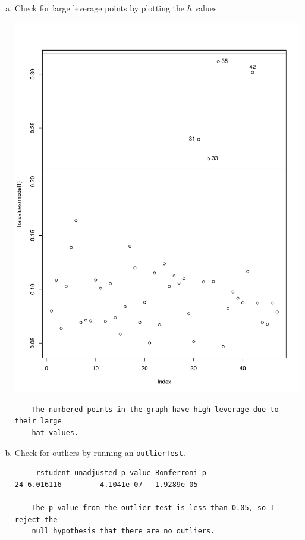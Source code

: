 \documentclass[12pt,letterpaper]{article}
\begin{document}
\begin{enumerate}[(a)]
	\item Check for large leverage points by plotting the $h$ values. 
	
	\includegraphics[width=.75\textwidth]{hatvalues.pdf}
	\begin{verbatim}
	The numbered points in the graph have high leverage due to their large
	hat values.
	\end{verbatim}
	
	\item Check for outliers by running an \texttt{outlierTest}. 
	
	\begin{verbatim}
	 rstudent unadjusted p-value Bonferroni p
24 6.016116         4.1041e-07   1.9289e-05

	The p value from the outlier test is less than 0.05, so I reject the
	null hypothesis that there are no outliers. 
	\end{verbatim}
	

\end{enumerate}
\end{document}
